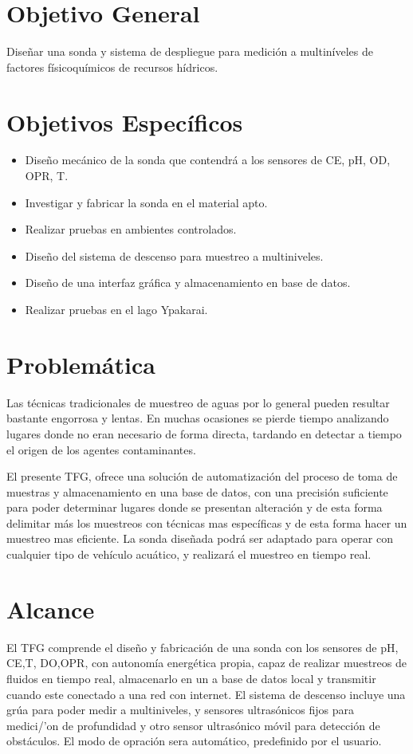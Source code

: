 \section{Objetivo General}
Dise\~nar una sonda y sistema de despliegue para medici\'on a multin\'iveles de factores f\'isicoqu\'imicos de recursos h\'idricos.
\section{Objetivos Específicos}

\begin{itemize}
	\item Dise\~no mec\'anico de la sonda que contendr\'a a los sensores de CE, pH, OD, OPR, T.
    \item Investigar y fabricar  la sonda en el material apto.
    \item Realizar pruebas en ambientes controlados.
    \item Dise\~no del sistema de descenso para muestreo a multiniveles.
    \item Dise\~no de una interfaz gr\'afica y almacenamiento en base de datos.  
    \item Realizar pruebas en el lago Ypakarai.

\end{itemize}

\section{Problem\'atica} 

Las t\'ecnicas tradicionales de muestreo de aguas por lo general pueden resultar bastante engorrosa y lentas. En muchas ocasiones se pierde tiempo analizando lugares donde no eran necesario de forma directa, tardando en detectar a tiempo el origen de los agentes contaminantes.  
 
El presente TFG, ofrece una soluci\'on de automatizaci\'on del proceso de toma de muestras y almacenamiento en una base de datos, con una precisi\'on suficiente para poder determinar lugares donde se presentan alteraci\'on y de esta forma delimitar m\'as los muestreos con t\'ecnicas mas espec\'ificas y de esta forma hacer un muestreo mas eficiente.
La sonda diseñada podr\'a ser adaptado para operar con cualquier tipo de vehículo acu\'atico, y realizar\'a el muestreo en tiempo real.  

\section{Alcance}
El TFG comprende el dise\~no y fabricaci\'on de una sonda con los sensores de pH, CE,T, DO,OPR, con autonom\'ia energ\'etica propia, capaz de realizar muestreos de fluidos en tiempo real, almacenarlo en un a base de datos local y transmitir cuando este conectado a una red con internet. 
El sistema de descenso incluye una gr\'ua para poder medir a multiniveles, y sensores ultras\'onicos fijos para medici/'on de profundidad y otro sensor ultras\'onico m\'ovil para detección de obst\'aculos.  
El modo de opraci\'on sera autom\'atico, predefinido por el usuario.


